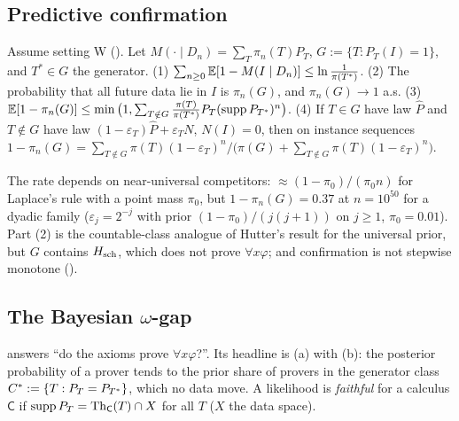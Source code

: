 \subsection{Predictive confirmation}\label{sec:univ:confirm}

\begin{theorem}\label{thm:univ:confirm}
Assume setting W (). Let $M(\cdot\mid D_n)=\sum_T\pi_n(T)P_T$, $G:=\{T:P_T(I)=1\}$, and $T^*\in G$ the generator. \textup{(1)} $\sum_{n\ge0}\mathbb{E}[1-M(I\mid D_n)]\le\ln\frac1{\pi(T^*)}$. \textup{(2)} The probability that all future data lie in $I$ is $\pi_n(G)$, and $\pi_n(G)\to1$ a.s. \textup{(3)} $\mathbb{E}[1-\pi_n(G)]\le\min\big(1,\sum_{T\notin G}\frac{\pi(T)}{\pi(T^*)}P_T(\operatorname{supp}P_{T^*})^n\big)$. \textup{(4)} If $T\in G$ have law $\hat P$ and $T\notin G$ have law $(1-\varepsilon_T)\hat P+\varepsilon_TN$, $N(I)=0$, then on instance sequences $1-\pi_n(G)=\sum_{T\notin G}\pi(T)(1-\varepsilon_T)^n\big/\big(\pi(G)+\sum_{T\notin G}\pi(T)(1-\varepsilon_T)^n\big)$.
\end{theorem}

\noindent The rate depends on near-universal competitors: $\approx(1-\pi_0)/(\pi_0n)$ for Laplace's rule with a point mass $\pi_0$, but $1-\pi_n(G)=0.37$ at $n=10^{50}$ for a dyadic family ($\varepsilon_j=2^{-j}$ with prior $(1-\pi_0)/(j(j+1))$ on $j\ge1$, $\pi_0=0.01$). Part (2) is the countable-class analogue of Hutter's result for the universal prior, but $G$ contains $H_{\mathrm{sch}}$, which does not prove $\forall x\varphi$; and confirmation is not stepwise monotone ().

\subsection{The Bayesian \texorpdfstring{$\omega$}{omega}-gap}\label{sec:univ:omega}

 answers ``do the axioms prove $\forall x\varphi$?''. Its headline is (a) with (b): the posterior probability of a prover tends to the prior share of provers in the generator class $C^{*}:=\{T:P_T=P_{T^*}\}$, which no data move. A likelihood is \emph{faithful} for a calculus $\mathsf C$ if $\operatorname{supp}P_T=\mathrm{Th}_{\mathsf C}(T)\cap X$ for all $T$ ($X$ the data space).

